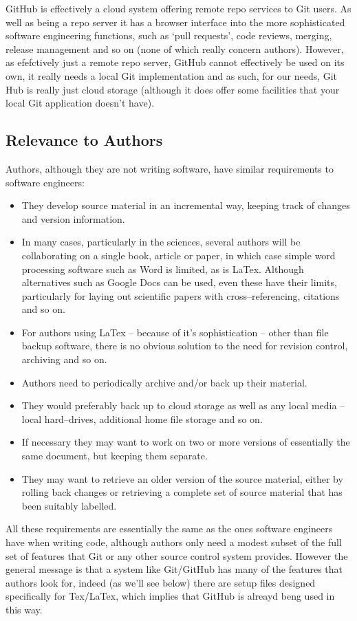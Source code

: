 \documentclass[a4paper, 12pt]{article}
\begin{document}
GitHub is effectively a cloud system offering remote repo services to Git users. As well as being a repo server it has a browser interface into the more sophisticated software engineering functions, such as `pull requests', code reviews, merging, release management and so on (none of which really concern authors). However, as efefctively just a remote repo server, GitHub cannot effectively be used on its own, it really needs a local Git implementation and as such, for our needs, Git Hub is really just cloud storage (although it does offer some facilities that your local Git application doesn't have).

\subsection{Relevance to Authors}
Authors, although they are not writing software, have similar requirements to software engineers:
\begin{itemize}
\item They develop source material in an incremental way, keeping track of changes and version information.
\item In many cases, particularly in the sciences, several authors will be collaborating on a single book, article or paper, in which case simple word processing software such as Word is limited, as is LaTex. Although alternatives such as Google Docs can be used, even these have their limits, particularly for laying out scientific papers with cross--referencing, citations and so on.
\item For authors using LaTex -- because of it's sophistication -- other than file backup software, there is no obvious solution to the need for revision control, archiving and so on.
\item Authors need to periodically archive and/or back up their material.
\item They would preferably back up to cloud storage as well as any local media -- local hard--drives, additional home file storage and so on.
\item If necessary they may want to work on two or more versions of essentially the same document, but keeping them separate.
\item They may want to retrieve an older version of the source material, either by rolling back changes or retrieving a complete set of source material that has been suitably labelled.
\end{itemize}
All these requirements are essentially the same as the ones software engineers have when writing code, although authors only need a modest subset of the full set of features that Git or any other source control system provides. However the general message is that a system like Git/GitHub has many of the features that authors look for, indeed (as we'll see below) there are setup files designed specifically for Tex/LaTex, which implies that GitHub is alreayd beng used in this way.
\end{document}
